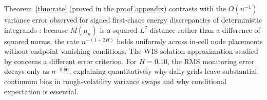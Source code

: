 Theorem~\ref{thm:rate} (proved in the \hyperref[app:proofs]{proof appendix}) contrasts with the $O(n^{-1})$ variance
error observed for signed first-chaos energy discrepancies of deterministic integrands
\citep{AHMED2026111045}: because $M(\mu_n)$ is a squared $L^2$ distance rather
than a difference of squared norms, the rate $n^{-(1+2H)}$ holds uniformly across in-cell node placements
without endpoint vanishing conditions. The WIS solution approximation studied by \citet{ErdoganLordSchieven2024WIS} concerns a different error criterion. For $H=0.10$, the RMS monitoring error decays only as
$n^{-0.60}$, explaining quantitatively why daily grids leave substantial continuum bias in rough-volatility
variance swaps and why conditional expectation is essential.
